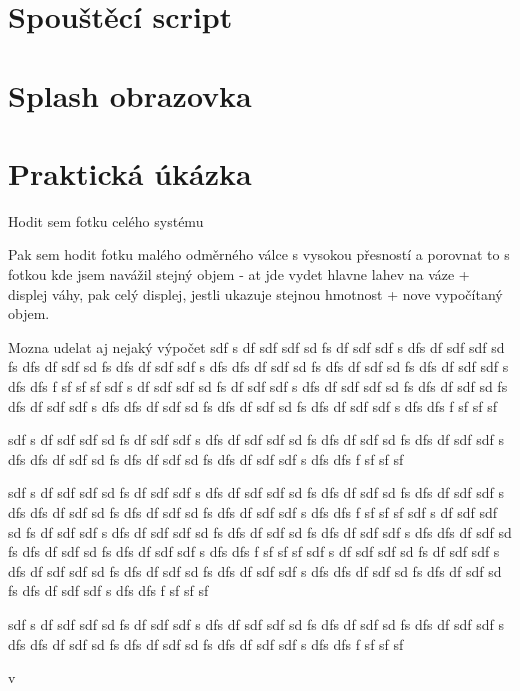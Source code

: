 \section{Spouštěcí script}
\section{Splash obrazovka}
\section{Praktická úkázka}
Hodit sem fotku celého systému

Pak sem hodit fotku malého odměrného válce s vysokou přesností a porovnat to s fotkou kde jsem navážil stejný objem - at jde vydet hlavne lahev na váze + displej váhy, pak celý displej, jestli ukazuje stejnou hmotnost + nove vypočítaný objem.

Mozna udelat aj nejaký výpočet
sdf
s
df
sdf
sdf
sd
fs
df
sdf
sdf
s
dfs
df
sdf
sdf
sd
fs
dfs
df
sdf
sd
fs
dfs
df
sdf
sdf
s
dfs
dfs
df
sdf
sd
fs
dfs
df
sdf
sd
fs
dfs
df
sdf
sdf
s
dfs
dfs
f
sf
sf
sf
sdf
s
df
sdf
sdf
sd
fs
df
sdf
sdf
s
dfs
df
sdf
sdf
sd
fs
dfs
df
sdf
sd
fs
dfs
df
sdf
sdf
s
dfs
dfs
df
sdf
sd
fs
dfs
df
sdf
sd
fs
dfs
df
sdf
sdf
s
dfs
dfs
f
sf
sf
sf

sdf
s
df
sdf
sdf
sd
fs
df
sdf
sdf
s
dfs
df
sdf
sdf
sd
fs
dfs
df
sdf
sd
fs
dfs
df
sdf
sdf
s
dfs
dfs
df
sdf
sd
fs
dfs
df
sdf
sd
fs
dfs
df
sdf
sdf
s
dfs
dfs
f
sf
sf
sf

sdf
s
df
sdf
sdf
sd
fs
df
sdf
sdf
s
dfs
df
sdf
sdf
sd
fs
dfs
df
sdf
sd
fs
dfs
df
sdf
sdf
s
dfs
dfs
df
sdf
sd
fs
dfs
df
sdf
sd
fs
dfs
df
sdf
sdf
s
dfs
dfs
f
sf
sf
sf
sdf
s
df
sdf
sdf
sd
fs
df
sdf
sdf
s
dfs
df
sdf
sdf
sd
fs
dfs
df
sdf
sd
fs
dfs
df
sdf
sdf
s
dfs
dfs
df
sdf
sd
fs
dfs
df
sdf
sd
fs
dfs
df
sdf
sdf
s
dfs
dfs
f
sf
sf
sf
sdf
s
df
sdf
sdf
sd
fs
df
sdf
sdf
s
dfs
df
sdf
sdf
sd
fs
dfs
df
sdf
sd
fs
dfs
df
sdf
sdf
s
dfs
dfs
df
sdf
sd
fs
dfs
df
sdf
sd
fs
dfs
df
sdf
sdf
s
dfs
dfs
f
sf
sf
sf

sdf
s
df
sdf
sdf
sd
fs
df
sdf
sdf
s
dfs
df
sdf
sdf
sd
fs
dfs
df
sdf
sd
fs
dfs
df
sdf
sdf
s
dfs
dfs
df
sdf
sd
fs
dfs
df
sdf
sd
fs
dfs
df
sdf
sdf
s
dfs
dfs
f
sf
sf
sf

v
